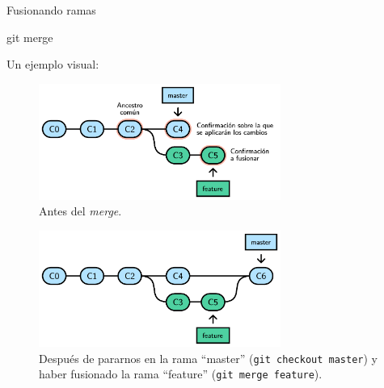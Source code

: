 \begin{frame}[t]{Fusionando ramas}
    \begin{comando}
        git merge
    \end{comando}

    \pause

    \pause
    Un ejemplo visual:
     {
        \begin{figure}[ht]
            \begin{center}
                \includegraphics[height=1.5in]{images/merge-branch-0.pdf}
            \end{center}
            \caption{Antes del \textit{merge}.}
        \end{figure}
    }
     {
        \begin{figure}[ht]
            \begin{center}
                \includegraphics[height=1.5in]{images/merge-branch-1.pdf}
            \end{center}
            \caption{Después de pararnos en la rama ``master'' (\texttt{git checkout master}) y haber fusionado la rama ``feature'' (\texttt{git merge feature}).}
        \end{figure}
    }
\end{frame}

